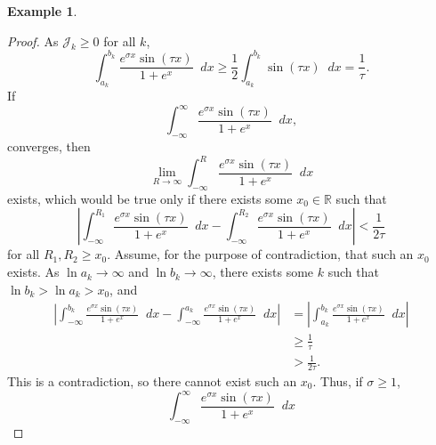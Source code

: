 \documentclass[a4paper]{article}
\newcommand*\diff{\mathop{}\!d} %
\newcommand{\R}{\mathbb{R}}
\theoremstyle{definition}
\newtheorem{example}[theorem]{Example}
\begin{document}
\begin{example}
\begin{proof}
        As $\mathcal{J}_k \geq 0$ for all $k$,
        \begin{equation*}
            \int_{a_k}^{b_k} \frac{e^{\sigma x}\sin(\tau x)}{1+e^x} \diff x \geq \frac{1}{2} \int_{a_k}^{b_k} \sin(\tau x) \diff x = \frac{1}{\tau}.
        \end{equation*}
        If
        \begin{equation*}
            \int_{-\infty}^\infty \frac{e^{\sigma x}\sin(\tau x)}{1+e^x} \diff x,
        \end{equation*}
        converges, then
        \begin{equation*}
            \lim_{R \to \infty} \int_{-\infty}^R \frac{e^{\sigma x}\sin(\tau x)}{1+e^x} \diff x
        \end{equation*}
        exists, which would be true only if there exists some $x_0 \in \R$ such that
        \begin{equation*}
            \left\lvert \int_{-\infty}^{R_1} \frac{e^{\sigma x}\sin(\tau x)}{1+e^x} \diff x - \int_{-\infty}^{R_2} \frac{e^{\sigma x}\sin(\tau x)}{1+e^x} \diff x \right\rvert < \frac{1}{2\tau}
        \end{equation*}
        for all $R_1, R_2 \geq x_0$.
        Assume, for the purpose of contradiction, that such an $x_0$ exists.
        As $\ln a_k \to \infty$ and $\ln b_k \to \infty$, there exists some $k$ such that $\ln b_k > \ln a_k > x_0$, and
        \begin{align*}
            \left\lvert \int_{-\infty}^{b_k} \frac{e^{\sigma x}\sin(\tau x)}{1+e^x} \diff x - \int_{-\infty}^{a_k} \frac{e^{\sigma x}\sin(\tau x)}{1+e^x} \diff x \right\rvert & = \left\lvert \int_{a_k}^{b_k} \frac{e^{\sigma x}\sin(\tau x)}{1+e^x} \diff x \right\rvert \\
                                                                                                                                                                               & \geq \frac{1}{\tau}                                                                        \\
                                                                                                                                                                               & > \frac{1}{2\tau}.
        \end{align*}
        This is a contradiction, so there cannot exist such an $x_0$.
        Thus, if $\sigma \geq 1$,
        \begin{equation*}
            \int_{-\infty}^\infty \frac{e^{\sigma x}\sin(\tau x)}{1+e^x} \diff x

\end{equation*}
\end{proof}
\end{example}
\end{document}
